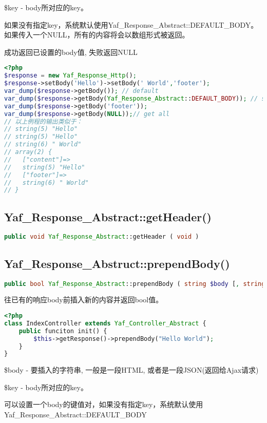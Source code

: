 \begin{compactitem}
\item\$key - body所对应的key。

如果没有指定key，系统默认使用Yaf\_Response\_Abstract::DEFAULT\_BODY。如果传入一个NULL，所有的内容将会以数组形式被返回。
\end{compactitem}

成功返回已设置的body值, 失败返回NULL

\begin{lstlisting}[language=PHP]
<?php
$response = new Yaf_Response_Http();
$response->setBody('Hello')->setBody(' World','footer');
var_dump($response->getBody()); // default
var_dump($response->getBody(Yaf_Response_Abstract::DEFAULT_BODY)); // same as above
var_dump($response->getBody('footer'));
var_dump($response->getBody(NULL));// get all
// 以上例程的输出类似于：
// string(5) "Hello"
// string(5) "Hello"
// string(6) " World"
// array(2) {
//   ["content"]=>
//   string(5) "Hello"
//   ["footer"]=>
//   string(6) " World"
// }
\end{lstlisting}


\subsection{Yaf\_Response\_Abstract::getHeader()}

\begin{lstlisting}[language=PHP]
public void Yaf_Response_Abstract::getHeader ( void )
\end{lstlisting}



\subsection{Yaf\_Response\_Abstruct::prependBody()}

\begin{lstlisting}[language=PHP]
public bool Yaf_Response_Abstract::prependBody ( string $body [, string $key ] )
\end{lstlisting}

往已有的响应body前插入新的内容并返回bool值。

\begin{lstlisting}[language=PHP]
<?php
class IndexController extends Yaf_Controller_Abstract {
    public funciton init() {
        $this->getResponse()->prependBody("Hello World");
    }
}
\end{lstlisting}

\begin{compactitem}
\item \$body - 要插入的字符串, 一般是一段HTML, 或者是一段JSON(返回给Ajax请求)
\item \$key - body所对应的key。

可以设置一个body的键值对，如果没有指定key，系统默认使用Yaf\_Response\_Abstract::DEFAULT\_BODY
\end{compactitem}

